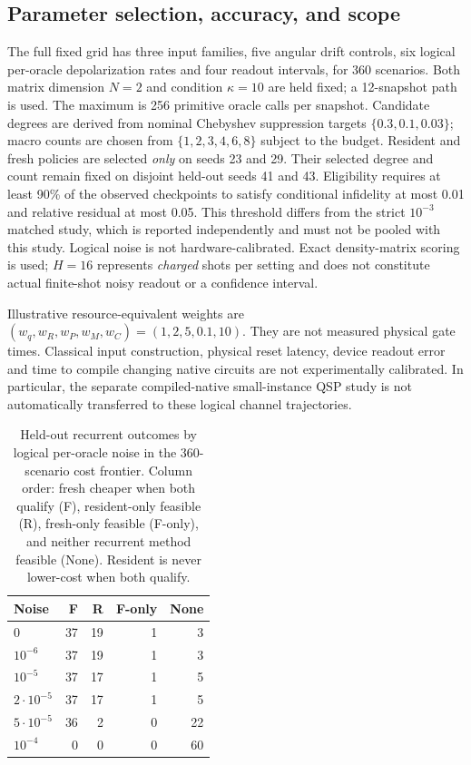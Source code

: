 \documentclass[10pt]{article}
\begin{document}
\subsection{Parameter selection, accuracy, and scope}
The full fixed grid has three input families, five angular drift controls,
six logical per-oracle depolarization rates and four readout intervals,
for 360 scenarios. Both matrix dimension $N=2$ and condition $\kappa=10$
are held fixed; a 12-snapshot path is used. The maximum is 256 primitive
oracle calls per snapshot. Candidate degrees are derived from nominal
Chebyshev suppression targets $\{0.3,0.1,0.03\}$; macro counts are chosen
from $\{1,2,3,4,6,8\}$ subject to the budget.
Resident and fresh policies are selected \emph{only} on seeds 23 and 29.
Their selected degree and count remain fixed on disjoint held-out seeds
41 and 43. Eligibility requires at least 90\% of the observed checkpoints
to satisfy conditional infidelity at most 0.01 and relative residual at
most 0.05. This threshold differs from the strict $10^{-3}$ matched study,
which is reported independently and must not be pooled with this study.
Logical noise is not hardware-calibrated. Exact density-matrix scoring is
used; $H=16$ represents \emph{charged} shots per setting and does not
constitute actual finite-shot noisy readout or a confidence interval.

Illustrative resource-equivalent weights are
$(w_q,w_R,w_P,w_M,w_C)=(1,2,5,0.1,10)$. They are not measured
physical gate times. Classical input construction, physical reset latency,
device readout error and time to compile changing native circuits are not
experimentally calibrated. In particular, the separate compiled-native
small-instance QSP study is not automatically transferred to these logical
channel trajectories.

\begin{table}[!htbp]\centering\small
\caption{Held-out recurrent outcomes by logical per-oracle noise in the
360-scenario cost frontier. Column order: fresh cheaper when both qualify
(F), resident-only feasible (R), fresh-only feasible (F-only), and neither
recurrent method feasible (None). Resident is never lower-cost when both qualify.}
\label{tab:costfrontiernoise}
\begin{tabular}{lrrrr}\toprule
Noise & F & R & F-only & None\\\midrule
$0$ & 37 & 19 & 1 & 3\\
$10^{-6}$ & 37 & 19 & 1 & 3\\
$10^{-5}$ & 37 & 17 & 1 & 5\\
$2\cdot10^{-5}$ & 37 & 17 & 1 & 5\\
$5\cdot10^{-5}$ & 36 & 2 & 0 & 22\\
$10^{-4}$ & 0 & 0 & 0 & 60\\\bottomrule
\end{tabular}
\end{table}
\end{document}
